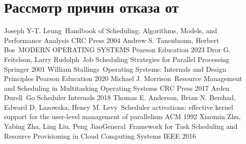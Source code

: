 \documentclass[12pt, oneside]{book}
\begin{document}
\section{Рассмотр причин отказа от }

\renewcommand{\bibname}{\large СПИСОК ИСПОЛЬЗОВАННЫХ ИСТОЧНИКОВ}
\begin{thebibliography}{9}
  \vspace*{0.3cm}
  Joseph Y-T. Leung\ Handbook of Scheduling: Algorithms, Models, and Performance Analysis CRC Press 2004
  Andrew S. Tanenbaum, Herbert Bos\ MODERN OPERATING SYSTEMS Pearson
  Education 2023
  Dror G. Feitelson, Larry Rudolph\ Job Scheduling
  Strategies for Parallel Processing Springer 2001
  William Stallings\ Operating Systems: Internals and
  Design Principles Pearson Education 2020
  Michael J. Morrison\ Resource Management and Scheduling
  in Multitasking Operating Systems CRC Press 2017
  Arden Durell\ Go Scheduler Internals 2018
  Thomas E. Anderson, Brian N. Bershad, Edward D. Lazowska, 
  Henry M. Levy\ Scheduler activations: effective kernel
  support for the user-level management of parallelism ACM 1992
  Xiaomin Zhu, Yabing Zha, Ling Liu, Peng JiaoGeneral\
  Framework for Task Scheduling and Resource Provisioning
  in Cloud Computing Systems IEEE 2016
\end{thebibliography}
\end{document}
